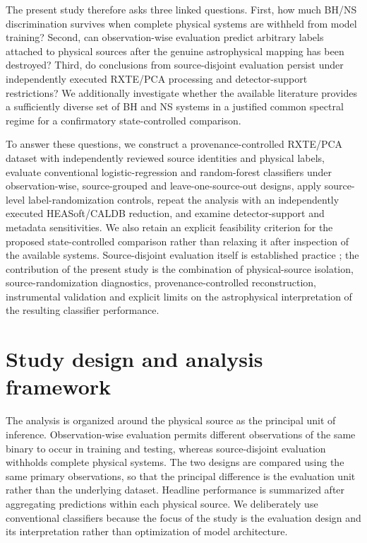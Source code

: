 \documentclass[final,5p,authoryear,nopreprintline]{elsarticle}
\begin{document}
The present study therefore asks three linked questions. First, how much BH/NS discrimination survives when complete physical systems are withheld from model training? Second, can observation-wise evaluation predict arbitrary labels attached to physical sources after the genuine astrophysical mapping has been destroyed? Third, do conclusions from source-disjoint evaluation persist under independently executed RXTE/PCA processing and detector-support restrictions? We additionally investigate whether the available literature provides a sufficiently diverse set of BH and NS systems in a justified common spectral regime for a confirmatory state-controlled comparison.

To answer these questions, we construct a provenance-controlled RXTE/PCA dataset with independently reviewed source identities and physical labels, evaluate conventional logistic-regression and random-forest classifiers under observation-wise, source-grouped and leave-one-source-out designs, apply source-level label-randomization controls, repeat the analysis with an independently executed HEASoft/CALDB reduction, and examine detector-support and metadata sensitivities. We also retain an explicit feasibility criterion for the proposed state-controlled comparison rather than relaxing it after inspection of the available systems. Source-disjoint evaluation itself is established practice \citep{Gopalan2015,Pattnaik2021,deBeurs2022}; the contribution of the present study is the combination of physical-source isolation, source-randomization diagnostics, provenance-controlled reconstruction, instrumental validation and explicit limits on the astrophysical interpretation of the resulting classifier performance.

\section{Study design and analysis framework}
\label{sec:2}

The analysis is organized around the physical source as the principal unit of inference. Observation-wise evaluation permits different observations of the same binary to occur in training and testing, whereas source-disjoint evaluation withholds complete physical systems. The two designs are compared using the same primary observations, so that the principal difference is the evaluation unit rather than the underlying dataset. Headline performance is summarized after aggregating predictions within each physical source. We deliberately use conventional classifiers because the focus of the study is the evaluation design and its interpretation rather than optimization of model architecture.
\end{document}
